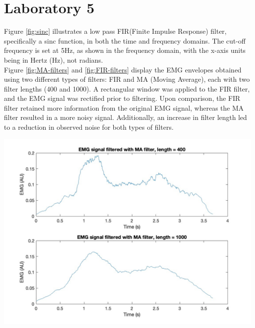 \documentclass[8pt]{article}  %
\theoremstyle{plain}
\theoremstyle{definition}
\theoremstyle{remark}
\begin{document}
    \section{Laboratory 5}
    \begin{minipage}{0.49\textwidth}
         Figure \ref{fig:sinc} illustrates a low pass FIR(Finite Impulse Response) filter,
         specifically a sinc function, in both the time and frequency domains. 
         The cut-off frequency is set at 5Hz, as shown in the frequency domain, 
         with the x-axis units being in Hertz (Hz), not radians.\\

         Figure \ref{fig:MA-filters} and \ref{fig:FIR-filters} display the EMG envelopes obtained using two different types of filters: 
         FIR and MA (Moving Average), 
         each with two filter lengths (400 and 1000). 
         A rectangular window was applied to the FIR filter, 
         and the EMG signal was rectified prior to filtering. 
         Upon comparison, the FIR filter retained more information from the original EMG signal, 
         whereas the MA filter resulted in a more noisy signal. 
         Additionally, an increase in filter length led to a reduction in observed noise for both types of filters.\\
         \vspace{0.3cm}

         \includegraphics[width=\linewidth]{figure/figure_5.jpg}
         \label{fig:MA-filters}


\end{minipage}
\end{document}
